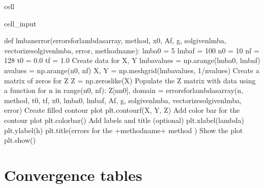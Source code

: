 \documentclass[letterpaper,10pt,english]{jupyterBook}
\begin{document}
\begin{sphinxuseclass}{cell}
\begin{sphinxVerbatimInput}
\begin{sphinxuseclass}{cell_input}
\begin{sphinxVerbatim}[commandchars=\\\{\}]
def lmba\PYGZus{}n\PYGZus{}error(errors\PYGZus{}for\PYGZus{}lambdas\PYGZus{}array, method, x0, Af, g, sol\PYGZus{}given\PYGZus{}lmba, vectorize\PYGZus{}sol\PYGZus{}given\PYGZus{}lmba, error, method\PYGZus{}name):
  lmba0 = 5
  lmbaf = 100
  n0 = 10
  nf = 128
  t0 = 0.0
  tf = 1.0
  \PYGZsh{} Create data for X, Y
  lmba\PYGZus{}values = np.arange(lmba0, lmbaf)
  n\PYGZus{}values = np.arange(n0, nf)
  X, Y = np.meshgrid(lmba\PYGZus{}values, 1/n\PYGZus{}values)
  \PYGZsh{} Create a matrix of zeros for Z
  Z = np.zeros\PYGZus{}like(X)
  \PYGZsh{} Populate the Z matrix with data using a function
  for n in range(n0, nf):
    Z[n\PYGZhy{}n0], domain = errors\PYGZus{}for\PYGZus{}lambdas\PYGZus{}array(n, method, t0, tf, x0, lmba0, lmbaf, Af, g, sol\PYGZus{}given\PYGZus{}lmba, vectorize\PYGZus{}sol\PYGZus{}given\PYGZus{}lmba, error)
  \PYGZsh{} Create filled contour plot
  plt.contourf(X, Y, Z)
  \PYGZsh{} Add color bar for the contour plot
  plt.colorbar()
  \PYGZsh{} Add labels and title (optional)
  plt.xlabel(\PYGZsq{}lambda\PYGZsq{})
  plt.ylabel(\PYGZsq{}h\PYGZsq{})
  plt.title(\PYGZsq{}errors for the \PYGZsq{}+method\PYGZus{}name+\PYGZsq{} method \PYGZsq{})
  \PYGZsh{} Show the plot
  plt.show()
\end{sphinxVerbatim}

\end{sphinxuseclass}\end{sphinxVerbatimInput}

\end{sphinxuseclass}

\section{Convergence tables}
\label{\detokenize{appendix:convergence-tables}}
\end{document}
